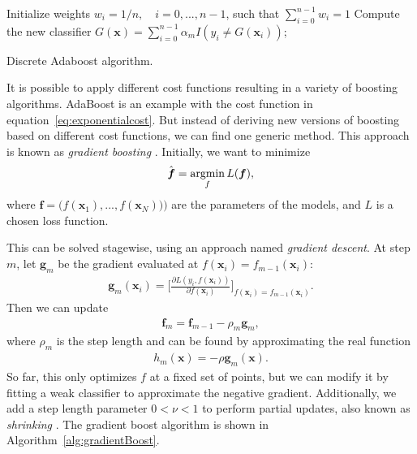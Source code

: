 \begin{algorithm}[H]
\SetAlgoLined
  Initialize weights $w_i = 1/n, \quad i=0,...,n-1$, such that $\sum_{i=0}^{n-1}w_i = 1$\;
 Compute the new classifier $G(\boldsymbol{x}) = \sum_{i=0}^{n-1} \alpha_m I(y_i \neq G(\boldsymbol{x}_i))$;
 \caption{Discrete Adaboost algorithm.}
 \label{alg:discreteAdaboost}
\end{algorithm}

\noindent It is possible to apply different cost functions resulting in a variety of boosting algorithms. AdaBoost is an example with the cost function in equation~\ref{eq:exponentialcost}. But instead of deriving new versions of boosting based on different cost functions, we can find one generic method. This approach is known as \textit{gradient boosting} \cite{friedman2001}. Initially, we want to minimize
\begin{align}
  \hat{\boldsymbol{f}} = \operatorname*{argmin}_f L(\boldsymbol{f}),
\end{align}
where $\boldsymbol{f} = \big(f(\boldsymbol{x}_1), ..., f(\boldsymbol{x}_N)) \big)$ are the parameters of the models, and $L$ is a chosen loss function.

This can be solved stagewise, using an approach named \textit{gradient descent}. At step $m$, let $\boldsymbol{g}_m$ be the gradient evaluated at $f(\boldsymbol{x}_i) = f_{m-1}(\boldsymbol{x}_i)$:
\begin{align}
  \boldsymbol{g}_m(\boldsymbol{x}_i) = \Bigg[ \frac{\partial L(y_i, f(\boldsymbol{x}_i))}{\partial f(\boldsymbol{x}_i)} \Bigg]_{f(\boldsymbol{x}_i)=f_{m-1}(\boldsymbol{x}_i)}.
\end{align}
Then we can update
\begin{align}
  \boldsymbol{f}_m = \boldsymbol{f}_{m-1} - \rho_m \boldsymbol{g}_m,
\end{align}
where $\rho_m$ is the step length and can be found by approximating the real function
\begin{align}
  h_m(\boldsymbol{x})= - \rho \boldsymbol{g}_m(\boldsymbol{x}).
\end{align}
So far, this only optimizes $f$ at a fixed set of points, but we can modify it by fitting a weak classifier to approximate the negative gradient. Additionally, we add a step length parameter $0<\nu<1$ to perform partial updates, also known as \textit{shrinking} \cite{Murphy2012}. The gradient boost algorithm is shown in Algorithm~\ref{alg:gradientBoost}.

